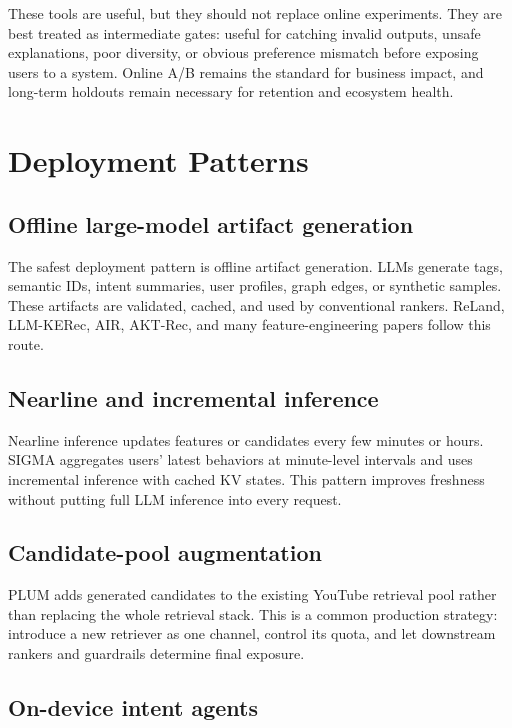 \documentclass[11pt]{article}
\begin{document}
These tools are useful, but they should not replace online experiments. They are best treated as intermediate gates: useful for catching invalid outputs, unsafe explanations, poor diversity, or obvious preference mismatch before exposing users to a system. Online A/B remains the standard for business impact, and long-term holdouts remain necessary for retention and ecosystem health.

\section{Deployment Patterns}

\subsection{Offline large-model artifact generation}

The safest deployment pattern is offline artifact generation. LLMs generate tags, semantic IDs, intent summaries, user profiles, graph edges, or synthetic samples. These artifacts are validated, cached, and used by conventional rankers. ReLand, LLM-KERec, AIR, AKT-Rec, and many feature-engineering papers follow this route.

\subsection{Nearline and incremental inference}

Nearline inference updates features or candidates every few minutes or hours. SIGMA aggregates users' latest behaviors at minute-level intervals and uses incremental inference with cached KV states. This pattern improves freshness without putting full LLM inference into every request.

\subsection{Candidate-pool augmentation}

PLUM adds generated candidates to the existing YouTube retrieval pool rather than replacing the whole retrieval stack. This is a common production strategy: introduce a new retriever as one channel, control its quota, and let downstream rankers and guardrails determine final exposure.

\subsection{On-device intent agents}
\end{document}
